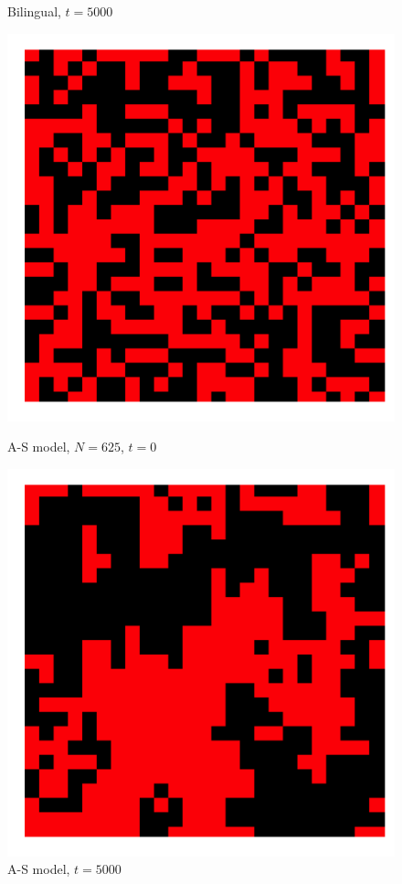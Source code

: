 \begin{figure}[h]
\begin{minipage}[t]{0.4\linewidth}
    \caption{\scriptsize Bilingual, \(t=5000\)}
    \label{reg_net_bi2}
\end{minipage}
\vspace{-5pt}
\begin{minipage}[t]{0.4\linewidth}
    \centering
    \includegraphics[width=\textwidth]{images/task1/smallw_Strogatz_t=1.png} 
    \caption{\scriptsize A-S model, \(N=625\), \(t=0\)}
    \label{reg_net_Str1}
\end{minipage}
\hfill
\begin{minipage}[t]{0.4\linewidth}
    \centering
    \includegraphics[width=\textwidth]{images/task1/smallw_Strogatz_t=5000.png} 
    \caption{\scriptsize A-S model, \(t=5000\)}
    \label{reg_net_Str2}
\end{minipage}
\end{figure}


